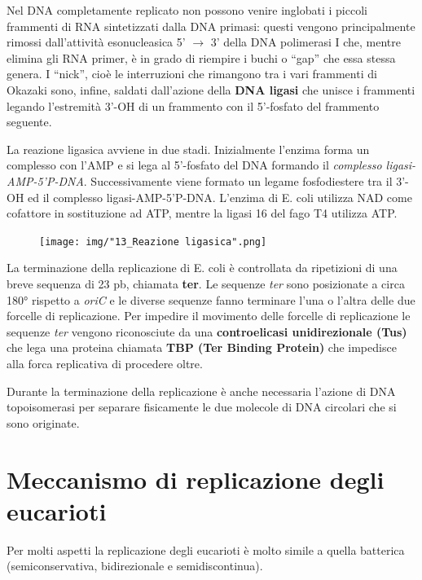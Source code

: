 \documentclass[11pt]{book}
\begin{document}
Nel DNA completamente replicato non possono venire inglobati i piccoli
frammenti di RNA sintetizzati dalla DNA primasi: questi vengono
principalmente rimossi dall'attività esonucleasica 5' \(\rightarrow\) 3'
della DNA polimerasi I che, mentre elimina gli RNA primer, è in grado di
riempire i buchi o ``gap'' che essa stessa genera. I ``nick'', cioè le
interruzioni che rimangono tra i vari frammenti di Okazaki sono, infine,
saldati dall'azione della \textbf{DNA ligasi} che unisce i frammenti
legando l'estremità 3'-OH di un frammento con il 5'-fosfato del
frammento seguente.

La reazione ligasica avviene in due stadi. Inizialmente l'enzima forma
un complesso con l'AMP e si lega al 5'-fosfato del DNA formando il
\emph{complesso ligasi-AMP-5'P-DNA}. Successivamente viene formato un
legame fosfodiestere tra il 3'-OH ed il complesso ligasi-AMP-5'P-DNA.
L'enzima di E. coli utilizza NAD come cofattore in sostituzione ad ATP,
mentre la ligasi 16 del fago T4 utilizza ATP.

\clearpage
\begin{figure}[htp]
\centering
\texttt{[image: img/"13\_Reazione ligasica".png]}
\caption{}
\label{replicazione-ligasica}
\end{figure}

La terminazione della replicazione di E. coli è controllata da
ripetizioni di una breve sequenza di 23 pb, chiamata \textbf{ter}. Le
sequenze \emph{ter} sono posizionate a circa 180° rispetto a \emph{oriC}
e le diverse sequenze fanno terminare l'una o l'altra delle due forcelle
di replicazione. Per impedire il movimento delle forcelle di
replicazione le sequenze \emph{ter} vengono riconosciute da una
\textbf{controelicasi unidirezionale (Tus)} che lega una proteina
chiamata \textbf{TBP (Ter Binding Protein)} che impedisce alla forca
replicativa di procedere oltre.

Durante la terminazione della replicazione è anche necessaria l'azione
di DNA topoisomerasi per separare fisicamente le due molecole di DNA
circolari che si sono originate.

\section{Meccanismo di replicazione degli
eucarioti}\label{meccanismo-di-replicazione-degli-eucarioti}

Per molti aspetti la replicazione degli eucarioti è molto simile a
quella batterica (semiconservativa, bidirezionale e semidiscontinua).
\end{document}
